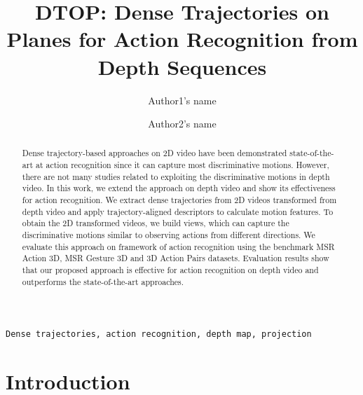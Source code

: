 \documentclass[final,3p,times,twocolumn]{elsarticle}
\begin{document}
\begin{frontmatter}

\title{DTOP: Dense Trajectories on Planes for Action Recognition from Depth Sequences}




\author{Author1's name}
\address{Adress 1}

\author{Author2's name}
\address{Adress 2}

\begin{abstract}
Dense trajectory-based approaches on 2D video have been demonstrated state-of-the-art at action recognition since it can capture most discriminative motions.
However, there are not many studies related to exploiting the discriminative motions in depth video.
In this work, we extend the approach on depth video and show its effectiveness for action recognition.
We extract dense trajectories from 2D videos transformed from depth video and apply trajectory-aligned descriptors to calculate motion features.
To obtain the 2D transformed videos, we build views, which can capture the discriminative motions similar to observing actions from different directions.
We evaluate this approach on framework of action recognition using the benchmark MSR Action 3D, MSR Gesture 3D and 3D Action Pairs datasets.
Evaluation results show that our proposed approach is effective for action recognition on depth video and outperforms the state-of-the-art approaches.
\end{abstract}

\begin{keyword}
\texttt{Dense trajectories, action recognition, depth map, projection}
\end{keyword}

\end{frontmatter}

\linenumbers

\section{Introduction}
\end{document}
